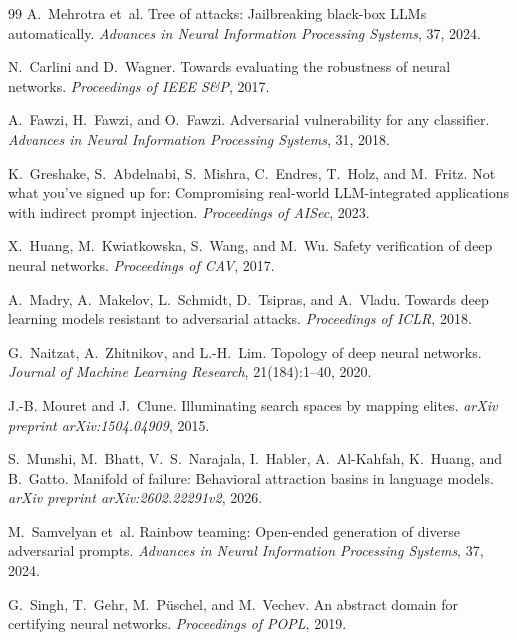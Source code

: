 \documentclass[11pt]{article}
\begin{document}
\begin{thebibliography}{99}
A.~Mehrotra et~al.
\newblock Tree of attacks: Jailbreaking black-box {LLMs} automatically.
\newblock \emph{Advances in Neural Information Processing Systems}, 37,
2024.

N.~Carlini and D.~Wagner.
\newblock Towards evaluating the robustness of neural networks.
\newblock \emph{Proceedings of IEEE S\&P}, 2017.

A.~Fawzi, H.~Fawzi, and O.~Fawzi.
\newblock Adversarial vulnerability for any classifier.
\newblock \emph{Advances in Neural Information Processing Systems}, 31, 2018.

K.~Greshake, S.~Abdelnabi, S.~Mishra, C.~Endres, T.~Holz, and M.~Fritz.
\newblock Not what you've signed up for: Compromising real-world
  {LLM}-integrated applications with indirect prompt injection.
\newblock \emph{Proceedings of AISec}, 2023.

X.~Huang, M.~Kwiatkowska, S.~Wang, and M.~Wu.
\newblock Safety verification of deep neural networks.
\newblock \emph{Proceedings of CAV}, 2017.

A.~Madry, A.~Makelov, L.~Schmidt, D.~Tsipras, and A.~Vladu.
\newblock Towards deep learning models resistant to adversarial attacks.
\newblock \emph{Proceedings of ICLR}, 2018.

G.~Naitzat, A.~Zhitnikov, and L.-H.~Lim.
\newblock Topology of deep neural networks.
\newblock \emph{Journal of Machine Learning Research}, 21(184):1--40, 2020.


J.-B. Mouret and J.~Clune.
\newblock Illuminating search spaces by mapping elites.
\newblock \emph{arXiv preprint arXiv:1504.04909}, 2015.

S.~Munshi, M.~Bhatt, V.~S.~Narajala, I.~Habler, A.~Al-Kahfah,
K.~Huang, and B.~Gatto.
\newblock Manifold of failure: Behavioral attraction basins in language
  models.
\newblock \emph{arXiv preprint arXiv:2602.22291v2}, 2026.

M.~Samvelyan et~al.
\newblock Rainbow teaming: Open-ended generation of diverse adversarial
  prompts.
\newblock \emph{Advances in Neural Information Processing Systems}, 37,
2024.

G.~Singh, T.~Gehr, M.~P{\"u}schel, and M.~Vechev.
\newblock An abstract domain for certifying neural networks.
\newblock \emph{Proceedings of POPL}, 2019.


\end{thebibliography}
\end{document}
